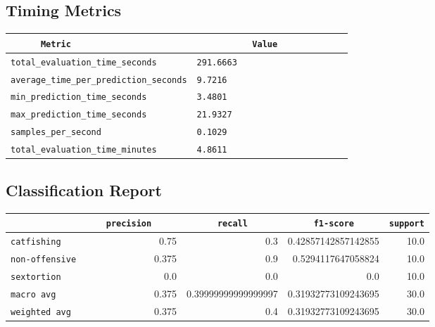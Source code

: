 \documentclass{article}
\begin{document}
\subsection{Timing Metrics}

\begin{center}
\begin{tabular}{l | l} \hline
    \verb|      Metric     | & \verb|           Value           | \\ \hline
    \hline
    \verb|total_evaluation_time_seconds| & \verb|291.6663                     | \\ \hline
    \verb|average_time_per_prediction_seconds| & \verb|9.7216                       | \\ \hline
    \verb|min_prediction_time_seconds| & \verb|3.4801                       | \\ \hline
    \verb|max_prediction_time_seconds| & \verb|21.9327                      | \\ \hline
    \verb|samples_per_second| & \verb|0.1029                       | \\ \hline
    \verb|total_evaluation_time_minutes| & \verb|4.8611                       | \\ \hline
\end{tabular}
\end{center}

\subsection{Classification Report}

\begin{center}
\begin{tabular}{l | r | r | r | r} \hline
    \verb|            | & \verb|    precision     | & \verb|      recall      | & \verb|     f1-score     | & \verb|support| \\ \hline
    \hline
    \verb|catfishing | & 0.75 & 0.3 & 0.42857142857142855 &    10.0 \\ \hline
    \verb|non-offensive| & 0.375 & 0.9 & 0.5294117647058824 &    10.0 \\ \hline
    \verb|sextortion | & 0.0 & 0.0 & 0.0 &    10.0 \\ \hline
    \verb|macro avg  | & 0.375 & 0.39999999999999997 & 0.31932773109243695 &    30.0 \\ \hline
    \verb|weighted avg| & 0.375 & 0.4 & 0.31932773109243695 &    30.0 \\ \hline
\end{tabular}
\end{center}
\end{document}
